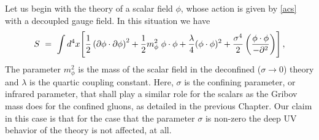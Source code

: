 Let us begin with the theory of a scalar field $\phi$, whose action is given by \eqref{acs}
with a decoupled gauge field. In this situation we have
\begin{eqnarray} 
S ~=~ \int d^4 x \Biggl[ \frac 12  \left(\partial{\phi}\cdot \partial{\phi} \right)^{2} + 
\frac12 m_{\phi}^2 \; {\phi}\cdot{\phi}
 + \frac{\lambda}{4}  ({\phi}\cdot{\phi})^{2} + 
\frac{\sigma^4}{2}  \left(  \frac{{\phi}\cdot{\phi}}{-\partial^2}\right)  \Biggr] \,,
\label{scalar}
\end{eqnarray}
The parameter $m_{\phi}^2$ is the mass of the scalar field in the deconfined ($\sigma \to 0$)
theory and $\lambda$ is the quartic coupling constant. Here,  $\sigma$ is the confining
parameter, or infrared parameter, that shall play a similar role for the scalars as the Gribov
mass does for the confined gluons, as detailed in the previous Chapter. Our claim in this case
is that for the case that the parameter $\sigma$ is non-zero the deep UV behavior of the theory
is not affected, at all.

